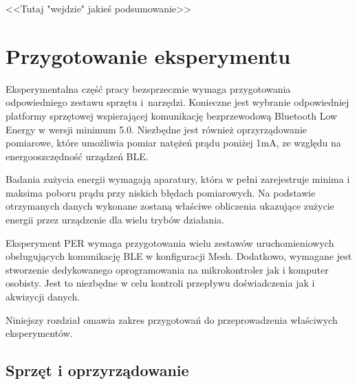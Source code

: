 <<Tutaj "wejdzie" jakieś podsumowanie>>
\lipsum[1-3]

\section{Przygotowanie eksperymentu}

Eksperymentalna część pracy bezsprzecznie wymaga przygotowania odpowiedniego zestawu
sprzętu i~narzędzi. Konieczne jest wybranie odpowiedniej platformy sprzętowej
wspierającej komunikację bezprzewodową Bluetooth Low Energy w wersji minimum 5.0.
Niezbędne jest również oprzyrządowanie pomiarowe, które umożliwia pomiar natężeń
prądu poniżej 1mA, ze względu na energooszczędność urządzeń \gls{BLE}.


Badania zużycia energii wymagają aparatury, która w pełni zarejestruje minima i maksima
poboru prądu przy niskich błędach pomiarowych. Na podstawie otrzymanych danych wykonane zostaną
właściwe obliczenia ukazujące zużycie energii przez urządzenie dla wielu trybów działania.

Eksperyment \gls{PER} wymaga przygotowania wielu zestawów uruchomieniowych obsługujących
komunikację BLE w konfiguracji Mesh. Dodatkowo, wymagane jest stworzenie dedykowanego oprogramowania
na mikrokontroler jak i komputer osobisty. Jest to niezbędne w celu kontroli przepływu
doświadczenia jak i akwizycji danych.

Niniejszy rozdział omawia zakres przygotowań do przeprowadzenia właściwych eksperymentów.


\subsection{Sprzęt i oprzyrządowanie}


